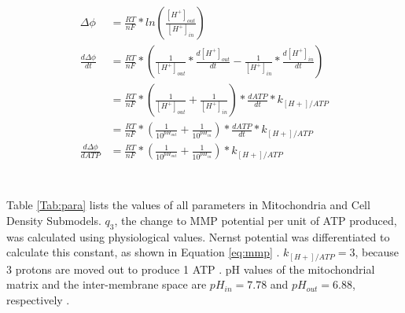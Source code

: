 \documentclass[12pt]{article}
\begin{document}
\begin{equation}
\begin{aligned}
\Delta \phi&=\frac{RT}{nF}*ln(\frac{[H^+]_{out}}{[H^+]_{in}})\\
\frac{d \Delta \phi}{dt}&=\frac{RT}{nF}*(\frac{1}{[H^+]_{out}}*\frac{d [H^+]_{out}}{dt}-\frac{1}{[H^+]_{in}}*\frac{d [H^+]_{in}}{dt})\\
&=\frac{RT}{nF}*(\frac{1}{[H^+]_{out}}+\frac{1}{[H^+]_{in}})*\frac{d ATP}{dt}*k_{[H+]/ATP}\\
&=\frac{RT}{nF}*(\frac{1}{10^{pH_{out}}}+\frac{1}{10^{pH_{in}}})*\frac{d ATP}{dt}*k_{[H+]/ATP}\\
\frac{d \Delta \phi}{d ATP}&=\frac{RT}{nF}*(\frac{1}{10^{pH_{out}}}+\frac{1}{10^{pH_{in}}})*k_{[H+]/ATP}\\
    \end{aligned}
    \label{eq:mmp}
\end{equation}\\\\
Table \ref{Tab:para} lists the values of all parameters in Mitochondria and Cell Density Submodels. $q_3$, the change to MMP potential per unit of ATP produced, was calculated using physiological values. Nernst potential was differentiated to calculate this constant, as shown in Equation \ref{eq:mmp} \cite{zorovaMitochondrialMembranePotential2018}. $k_{[H+]/ATP}=3$, because 3 protons are moved out to produce 1 ATP \cite{brandATPRatioATP1977}. pH values of the mitochondrial matrix and the inter-membrane space are $pH_{in}=7.78$ and $pH_{out}=6.88$, respectively \cite{porcelliPHDifferenceOuter2005}.
\pagebreak
\end{document}
